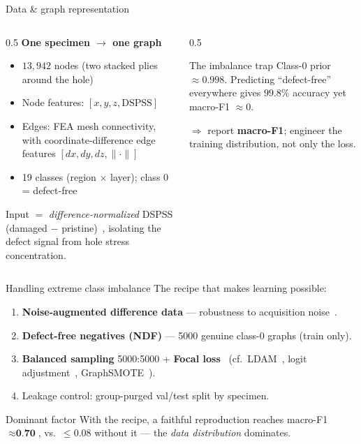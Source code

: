 \documentclass[aspectratio=169,10pt]{beamer}
\newcommand{\bad}[1]{{\color{alertred}#1}}
\begin{document}
\begin{frame}{Data \& graph representation}
\begin{columns}[T]
\begin{column}{0.5\textwidth}
\textbf{One specimen $\rightarrow$ one graph}
\begin{itemize}
  \item $13{,}942$ nodes (two stacked plies around the hole)
  \item Node features: $[x,y,z,\text{DSPSS}]$
  \item Edges: FEA mesh connectivity, with coordinate-difference
        edge features $[dx,dy,dz,\lVert\cdot\rVert]$
  \item 19 classes (region $\times$ layer); class 0 = defect-free
\end{itemize}
\vspace{0.5em}
Input $=$ \emph{difference-normalized} DSPSS (damaged $-$ pristine)~\cite{nishioka2025development},
isolating the defect signal from hole stress concentration.
\end{column}
\begin{column}{0.5\textwidth}
\begin{exampleblock}{The imbalance trap}
Class-0 prior $\approx 0.998$. Predicting ``defect-free'' everywhere gives
$99.8\%$ accuracy yet \bad{macro-F1 $\approx 0$}.
\end{exampleblock}
\vspace{0.3em}
$\Rightarrow$ report \textbf{macro-F1}; engineer the training distribution,
not only the loss.
\end{column}
\end{columns}
\end{frame}

\begin{frame}{Handling extreme class imbalance}
The recipe that makes learning possible:
\begin{enumerate}
  \item \textbf{Noise-augmented difference data} — robustness to acquisition noise~\cite{rong2020dropedge}.
  \item \textbf{Defect-free negatives (NDF)} — 5000 genuine class-0 graphs (train only).
  \item \textbf{Balanced sampling} 5000:5000 + \textbf{Focal loss}~\cite{lin2017focal}
        (cf.\ LDAM~\cite{cao2019learning}, logit adjustment~\cite{menon2020long},
        GraphSMOTE~\cite{zhao2021graphsmote}).
  \item Leakage control: group-purged val/test split by specimen.
\end{enumerate}
\vspace{0.5em}
\begin{alertblock}{Dominant factor}
With the recipe, a faithful reproduction reaches macro-F1 $\approx \textbf{0.70}$,
vs.\ $\le 0.08$ without it — the \emph{data distribution} dominates.
\end{alertblock}
\end{frame}
\end{document}
